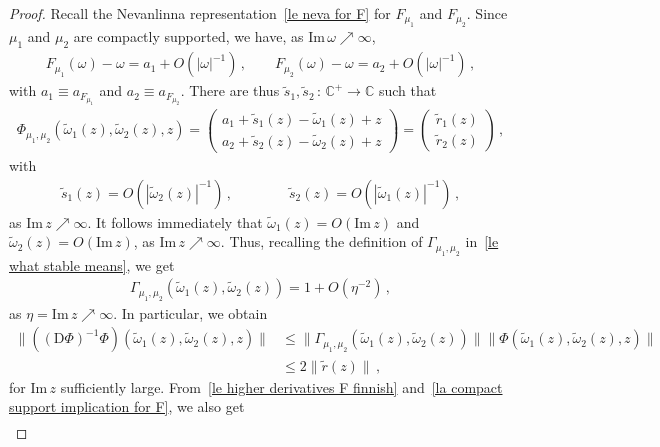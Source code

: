 \documentclass[10pt,reqno]{amsart}
\numberwithin{equation}{section}
\theoremstyle{plain}
\numberwithin{kevin}{section}
\theoremstyle{remark}
\newcommand{\im}{\mathrm{Im}\,}
\newcommand{\C}{{\mathbb C}}
\newcommand{\PP}{\Phi}
\begin{document}
\begin{proof}Recall the Nevanlinna representation~\eqref{le neva for F} for $F_{\mu_1}$ and $F_{\mu_2}$. Since $\mu_1$ and $\mu_2$ are compactly supported, we have, as $\im \omega\nearrow \infty$,
 \begin{align}\label{la compact support implication for F}
  F_{\mu_1}(\omega)-\omega=a_{1}+O(|\omega|^{-1})\,,\qquad F_{\mu_2}(\omega)-\omega=a_{2}+O(|\omega|^{-1})\,,
 \end{align}
 with $a_1\equiv a_{F_{\mu_1}}$ and $a_2\equiv a_{F_{\mu_2}}$.
There are thus $\widetilde s_1,\widetilde s_2\,:\,\C^+\to \C$ such that
\begin{align}\label{le ach}
\PP_{\mu_1,\mu_2}(\widetilde\omega_1(z),\widetilde\omega_2(z),z)=\left(\begin{array}{cc}a_{1}+\widetilde s_1(z)-\widetilde\omega_1(z)+z\\a_2+\widetilde s_2(z)-\widetilde\omega_2(z)+z \end{array} \right)=\left(\begin{array}{cc}\widetilde r_1(z)\\ \widetilde r_2(z) \end{array}\right)\,,
\end{align}
with 
\begin{align}
\widetilde s_1(z)=O(|\widetilde\omega_2(z)|^{-1})\,,\qquad\qquad \widetilde s_2(z)=O(|\widetilde\omega_1(z)|^{-1})\,,
\end{align}
as $\im z\nearrow \infty$. It follows immediately that $\widetilde\omega_1(z)=O(\im z)$ and $\widetilde\omega_2(z)=O(\im z)$, as $\im z\nearrow \infty$. Thus, recalling the definition of $\Gamma_{\mu_1,\mu_2}$ in~\eqref{le what stable means}, we get
\begin{align}
 \Gamma_{\mu_1,\mu_2}(\widetilde\omega_1(z),\widetilde\omega_2(z))=1+ O(\eta^{-2})\,,
\end{align}
as $\eta=\im z\nearrow \infty$. In particular, we obtain
\begin{align}
 \|((\mathrm{D}\PP)^{-1}\PP)(\widetilde\omega_1(z),\widetilde\omega_2(z),z)\|&\le \| \Gamma_{\mu_1,\mu_2}(\widetilde\omega_1(z),\widetilde\omega_2(z)) \| \|\PP(\widetilde\omega_1(z),\widetilde\omega_2(z),z)\|\nonumber\\
 &\le 2 \|\widetilde r(z)\|\,,
\end{align}
for $\im z$ sufficiently large. 
From~\eqref{le higher derivatives F finnish} and~\eqref{la compact support implication for F}, we also get
\begin{align}

\end{align}
\end{proof}
\end{document}
